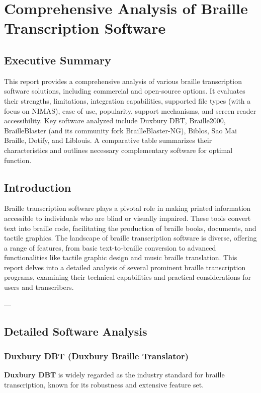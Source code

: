 \chapter{Comprehensive Analysis of Braille Transcription Software}
\author{Gemini AI}
\date{\today}
\maketitle

\section{Executive Summary}
This report provides a comprehensive analysis of various braille transcription software solutions, including commercial and open-source options. It evaluates their strengths, limitations, integration capabilities, supported file types (with a focus on NIMAS), ease of use, popularity, support mechanisms, and screen reader accessibility. Key software analyzed include Duxbury DBT, Braille2000, BrailleBlaster (and its community fork BrailleBlaster-NG), Biblos, Sao Mai Braille, Dotify, and Liblouis. A comparative table summarizes their characteristics and outlines necessary complementary software for optimal function.


\section{Introduction}
Braille transcription software plays a pivotal role in making printed information accessible to individuals who are blind or visually impaired. These tools convert text into braille code, facilitating the production of braille books, documents, and tactile graphics. The landscape of braille transcription software is diverse, offering a range of features, from basic text-to-braille conversion to advanced functionalities like tactile graphic design and music braille translation. This report delves into a detailed analysis of several prominent braille transcription programs, examining their technical capabilities and practical considerations for users and transcribers.

---

\section{Detailed Software Analysis}

\subsection{Duxbury DBT (Duxbury Braille Translator)}
\textbf{Duxbury DBT} is widely regarded as the industry standard for braille transcription, known for its robustness and extensive feature set.


